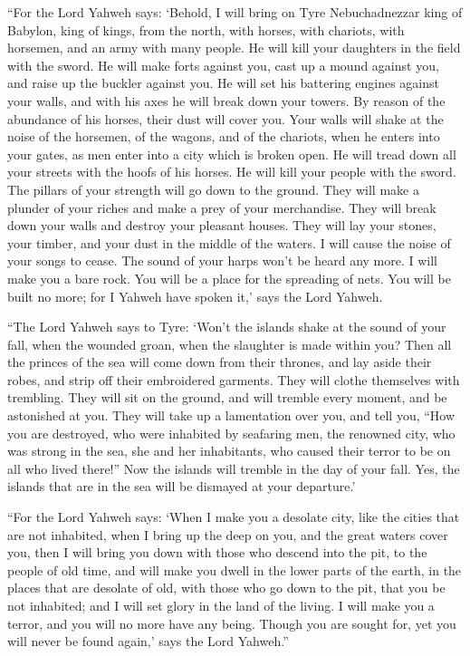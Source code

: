  ``For the Lord Yahweh says: `Behold, I will bring on Tyre
Nebuchadnezzar king of Babylon, king of kings, from the north, with
horses, with chariots, with horsemen, and an army with many people.
 He will kill your daughters in the field with the sword.
He will make forts against you, cast up a mound against you, and raise
up the buckler against you.  He will set his battering
engines against your walls, and with his axes he will break down your
towers.  By reason of the abundance of his horses, their
dust will cover you. Your walls will shake at the noise of the horsemen,
of the wagons, and of the chariots, when he enters into your gates, as
men enter into a city which is broken open.  He will
tread down all your streets with the hoofs of his horses. He will kill
your people with the sword. The pillars of your strength will go down to
the ground.  They will make a plunder of your riches and
make a prey of your merchandise. They will break down your walls and
destroy your pleasant houses. They will lay your stones, your timber,
and your dust in the middle of the waters.  I will cause
the noise of your songs to cease. The sound of your harps won't be heard
any more.  I will make you a bare rock. You will be a
place for the spreading of nets. You will be built no more; for I Yahweh
have spoken it,' says the Lord Yahweh.

 ``The Lord Yahweh says to Tyre: `Won't the islands shake
at the sound of your fall, when the wounded groan, when the slaughter is
made within you?  Then all the princes of the sea will
come down from their thrones, and lay aside their robes, and strip off
their embroidered garments. They will clothe themselves with trembling.
They will sit on the ground, and will tremble every moment, and be
astonished at you.  They will take up a lamentation over
you, and tell you, ``How you are destroyed, who were inhabited by
seafaring men, the renowned city, who was strong in the sea, she and her
inhabitants, who caused their terror to be on all who lived there!''
 Now the islands will tremble in the day of your fall.
Yes, the islands that are in the sea will be dismayed at your
departure.'

 ``For the Lord Yahweh says: `When I make you a desolate
city, like the cities that are not inhabited, when I bring up the deep
on you, and the great waters cover you,  then I will
bring you down with those who descend into the pit, to the people of old
time, and will make you dwell in the lower parts of the earth, in the
places that are desolate of old, with those who go down to the pit, that
you be not inhabited; and I will set glory in the land of the living.
 I will make you a terror, and you will no more have any
being. Though you are sought for, yet you will never be found again,'
says the Lord Yahweh.''

